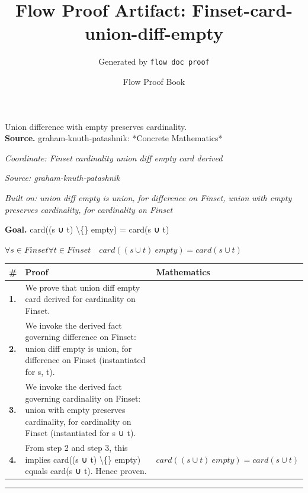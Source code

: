 \documentclass[11pt]{article}
\title{Flow Proof Artifact: Finset-card-union-diff-empty}
\author{Generated by \texttt{flow doc proof}}
\date{Flow Proof Book}
\theoremstyle{definition}
\begin{document}
\maketitle
Union difference with empty preserves cardinality.\\[0.5em]
\textbf{Source.} graham-knuth-patashnik: *Concrete Mathematics*\\[0.5em]
\bigskip
{}\par
\smallskip\noindent\textit{Coordinate: Finset \cdot cardinality \cdot union diff empty card derived}\par
\smallskip\noindent\textit{Source: graham-knuth-patashnik}\par
\smallskip\noindent\textit{Built on: union diff empty is union, for difference on Finset, union with empty preserves cardinality, for cardinality on Finset}\par
\medskip
\noindent\textbf{Goal.} card((s ∪ t) \textbackslash\{\} empty) = card(s ∪ t)\par
\noindent$\displaystyle \forall s \in Finset \forall t \in Finset\quad card((s ∪ t) \ empty) = card(s ∪ t)$\par
\medskip
\noindent
\begin{tabular}{@{} >{\raggedright\arraybackslash}p{} >{\raggedright\arraybackslash}p{} >{\raggedleft\arraybackslash}p{} @{}}
\textbf{\#} & \textbf{Proof} & \textbf{Mathematics} \\
\midrule
\textbf{1.} & We prove that union diff empty card derived for cardinality on Finset. & \\[0.45em]
\textbf{2.} & We invoke the derived fact governing difference on Finset: union diff empty is union, for difference on Finset (instantiated for s, t). & \\[0.45em]
\textbf{3.} & We invoke the derived fact governing cardinality on Finset: union with empty preserves cardinality, for cardinality on Finset (instantiated for s ∪ t). & \\[0.45em]
\textbf{4.} & From step 2 and step 3, this implies card((s ∪ t) \textbackslash\{\} empty) equals card(s ∪ t). Hence proven. & $\displaystyle card((s ∪ t) \ empty) = card(s ∪ t)$ \\[0.45em]
\bottomrule
\end{tabular}
\label{thm:Finset-cardinality-union_diff_empty_card_derived}
\par\medskip\hrule
\end{document}
